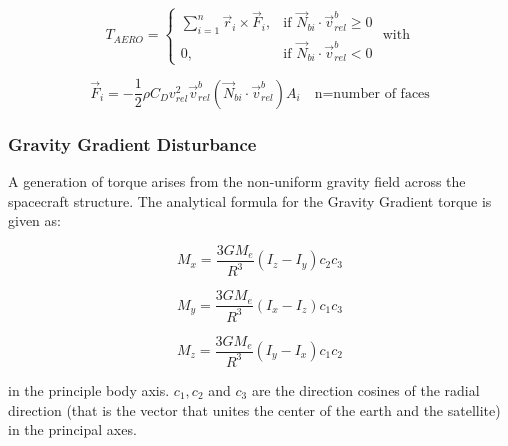 \[
T_{AERO} =
\begin{cases}
	\sum_{i=1}^{n} \vec{r}_i \times \vec{F}_i, & \text{if } \vec{N}_{bi} \cdot \vec{v}^{b}_{rel} \geq 0 \\
	0, & \text{if } \vec{N}_{bi} \cdot \vec{v}^{b}_{rel} < 0
\end{cases}
\text{ with }
\]

\[
\vec{F}_i = -\frac{1}{2} \rho C_D v_{rel}^2 \vec{v}_{rel}^{b} (\vec{N}_{bi} \cdot \vec{v}_{rel}^{b}) A_i \quad \text{n=number of faces}
\]


\subsubsection{Gravity Gradient Disturbance}

A generation of torque arises from the non-uniform gravity field across the spacecraft structure. The analytical formula for the Gravity Gradient torque is given as:

\[
M_x = \frac{3G M_e}{R^3} (I_z - I_y) c_2 c_3
\]

\[
M_y = \frac{3G M_e}{R^3} (I_x - I_z) c_1 c_3
\]

\[
M_z = \frac{3G M_e}{R^3} (I_y - I_x) c_1 c_2
\]

in the principle body axis. \( c_1, c_2 \) and \( c_3 \) are the direction cosines of the radial direction (that is the vector that unites the center of the earth and the satellite) in the principal axes.


\label{subsubsec:dist_GG}
